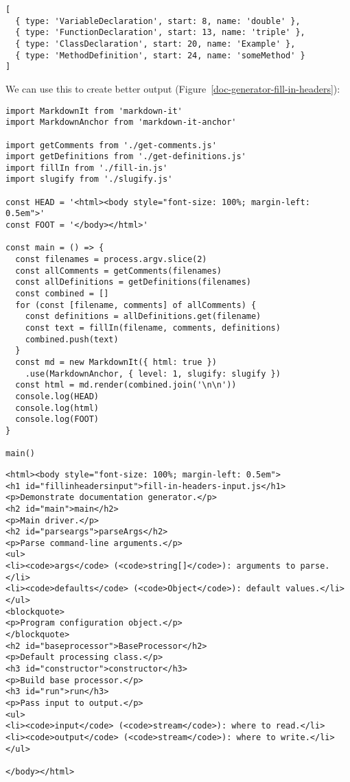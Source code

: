 \documentclass[krantzl]{krantz}
\newcommand{\figref}[1]{Figure~\ref{#1}}
\begin{document}
\begin{lstlisting}[frame=single,frameround=tttt]
[
  { type: 'VariableDeclaration', start: 8, name: 'double' },
  { type: 'FunctionDeclaration', start: 13, name: 'triple' },
  { type: 'ClassDeclaration', start: 20, name: 'Example' },
  { type: 'MethodDefinition', start: 24, name: 'someMethod' }
]
\end{lstlisting}



We can use this to create better output (\figref{doc-generator-fill-in-headers}):


\begin{lstlisting}[frame=single,frameround=tttt]
import MarkdownIt from 'markdown-it'
import MarkdownAnchor from 'markdown-it-anchor'

import getComments from './get-comments.js'
import getDefinitions from './get-definitions.js'
import fillIn from './fill-in.js'
import slugify from './slugify.js'

const HEAD = '<html><body style="font-size: 100%; margin-left: 0.5em">'
const FOOT = '</body></html>'

const main = () => {
  const filenames = process.argv.slice(2)
  const allComments = getComments(filenames)
  const allDefinitions = getDefinitions(filenames)
  const combined = []
  for (const [filename, comments] of allComments) {
    const definitions = allDefinitions.get(filename)
    const text = fillIn(filename, comments, definitions)
    combined.push(text)
  }
  const md = new MarkdownIt({ html: true })
    .use(MarkdownAnchor, { level: 1, slugify: slugify })
  const html = md.render(combined.join('\n\n'))
  console.log(HEAD)
  console.log(html)
  console.log(FOOT)
}

main()
\end{lstlisting}



\begin{lstlisting}[frame=single,frameround=tttt]
<html><body style="font-size: 100%; margin-left: 0.5em">
<h1 id="fillinheadersinput">fill-in-headers-input.js</h1>
<p>Demonstrate documentation generator.</p>
<h2 id="main">main</h2>
<p>Main driver.</p>
<h2 id="parseargs">parseArgs</h2>
<p>Parse command-line arguments.</p>
<ul>
<li><code>args</code> (<code>string[]</code>): arguments to parse.</li>
<li><code>defaults</code> (<code>Object</code>): default values.</li>
</ul>
<blockquote>
<p>Program configuration object.</p>
</blockquote>
<h2 id="baseprocessor">BaseProcessor</h2>
<p>Default processing class.</p>
<h3 id="constructor">constructor</h3>
<p>Build base processor.</p>
<h3 id="run">run</h3>
<p>Pass input to output.</p>
<ul>
<li><code>input</code> (<code>stream</code>): where to read.</li>
<li><code>output</code> (<code>stream</code>): where to write.</li>
</ul>

</body></html>
\end{lstlisting}
\end{document}
